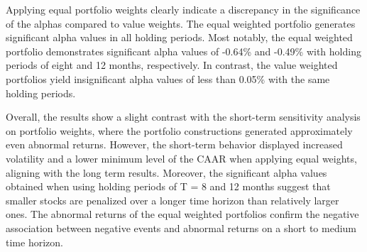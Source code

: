 Applying equal portfolio weights clearly indicate a discrepancy in the significance of the alphas compared to value weights. The equal weighted portfolio generates significant alpha values in all holding periods. Most notably, the equal weighted portfolio demonstrates significant alpha values of -0.64\% and -0.49\% with holding periods of eight and 12 months, respectively. In contrast, the value weighted portfolios yield insignificant alpha values of less than 0.05\% with the same holding periods. 

Overall, the results show a slight contrast with the short-term sensitivity analysis on portfolio weights, where the portfolio constructions generated approximately even abnormal returns. However, the short-term behavior displayed increased volatility and a lower minimum level of the CAAR when applying equal weights, aligning with the long term results. Moreover, the significant alpha values obtained when using holding periods of T = 8 and 12 months suggest that smaller stocks are penalized over a longer time horizon than relatively larger ones. The abnormal returns of the equal weighted portfolios confirm the negative association between negative events and abnormal returns on a short to medium time horizon. 

